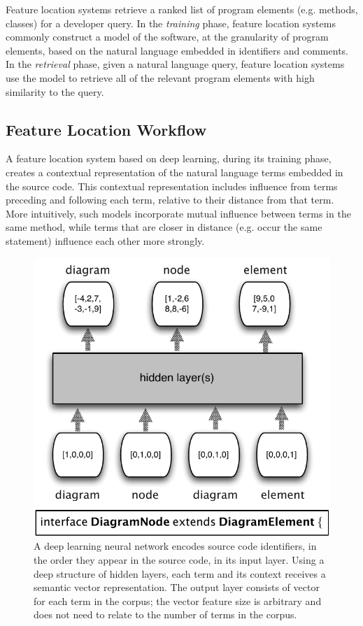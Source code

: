 
%
%

%
Feature location systems retrieve a ranked list of program elements (e.g.
methods, classes) for a developer query. In the {\em training} phase, feature
location systems commonly construct a model of the software, at the granularity
of program elements, based on the natural language embedded in identifiers and
comments. In the {\em retrieval} phase, given a natural language query, feature
location systems use the model to retrieve all of the relevant program elements
with high similarity to the query.

\subsection{Feature Location Workflow}

%
A feature location system based on deep learning, during its training phase,
creates a contextual representation of the natural language terms embedded in
the source code. This contextual representation includes influence from terms
preceding and following each term, relative to their distance from that term.
More intuitively, such models incorporate mutual influence between terms in the
same method, while terms that are closer in distance (e.g. occur the same
statement) influence each other more strongly.


\begin{figure}[tb]
\centering
\includegraphics[width=.9\columnwidth]{figures/neuralnet.pdf}
\caption{A deep learning neural network encodes source code identifiers, in the
order they appear in the source code, in its input layer. Using a deep
structure of hidden layers, each term and its context receives a semantic
vector representation. The output layer consists of vector for each term in
the corpus; the vector feature size is arbitrary and does not need to relate to
the number of terms in the corpus.}
\label{fig:neuralnet}
\end{figure}


